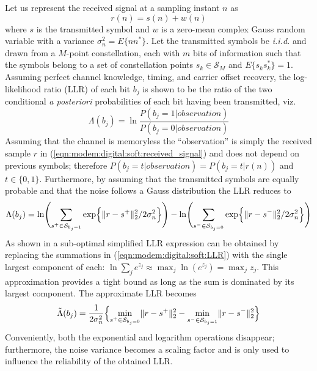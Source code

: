 %
Let us represent the received signal at a sampling instant $n$ as
%
\begin{equation}
\label{eqn:modem:digital:soft:received_signal}
    r(n) = s(n) + w(n)
\end{equation}
%
where $s$ is the transmitted symbol
and $w$ is a zero-mean complex Gauss random variable with
a variance $\sigma_n^2 = E\{n n^*\}$.
Let the transmitted symbols be {\em i.i.d.} and drawn from a $M$-point
constellation, each with $m$ bits of information
such that the symbols belong to a set of constellation points
$s_k \in \mathcal{S}_M$ and $E\{s_k s_k^*\}=1$.
%
Assuming perfect channel knowledge, timing, and carrier offset recovery,
the log-likelihood ratio (LLR) of each bit $b_j$ is shown to be
\cite[Eq.~(8)]{LeGoff:1994}
the ratio of the two conditional {\em a posteriori} probabilities of
each bit having been transmitted, viz.
%
\begin{equation}
\label{eqn:modem:digital:soft:LLR_true}
    \Lambda(b_j) =
        \ln \frac{
            P\left(b_j=1 | {observation} \right)
        }{
            P\left(b_j=0 | {observation} \right)
        }
\end{equation}
%
Assuming that the channel is memoryless the ``observation'' is simply
the received sample $r$ in
(\ref{eqn:modem:digital:soft:received_signal})
and does not depend on previous symbols; therefore
$P\left(b_j=t|{observation}\right) = P\left(b_j=t|r(n)\right)$
and $t \in \{0,1\}$.
Furthermore, by assuming that the transmitted symbols are equally
probable and that the noise follows a Gauss distribution
\cite{Qiang:2003}
the LLR reduces to
%
\begin{equation}
\label{eqn:modem:digital:soft:LLR}
    \Lambda(b_j) =
        \ln \Biggl(
            \sum_{s^+\in \mathcal{S}_{b_j=1}} { \exp\Bigl\{\|r-s^+\|_2^2 / 2 \sigma_n^2\Bigr\} }
        \Biggr)
       -\ln \Biggl(
            \sum_{s^-\in \mathcal{S}_{b_j=0}} { \exp\Bigl\{\|r-s^-\|_2^2 / 2 \sigma_n^2\Bigr\} }
        \Biggr)
\end{equation}
%
As shown in \cite{Qiang:2003} a sub-optimal simplified LLR expression
can be obtained by replacing the summations in
(\ref{eqn:modem:digital:soft:LLR}) with the single largest component of
each: $\ln \sum_j {e^{z_j}} \approx \max_j \ln (e^{z_j}) = \max_j z_j$.
This approximation provides a tight bound as long as the sum is
dominated by its largest component.
The approximate LLR becomes
%
\begin{equation}
\label{eqn:modem:digital:soft:LLR_approx}
    \tilde{\Lambda}(b_j) =
        \frac{1}{2\sigma_n^2}
        \Bigl\{
            \underset{s^+\in \mathcal{S}_{b_j=0}}{\min} \|r-s^+\|_2^2 -
            \underset{s^-\in \mathcal{S}_{b_j=1}}{\min} \|r-s^-\|_2^2
        \Bigr\}
\end{equation}
%
Conveniently, both the exponential and logarithm operations disappear;
furthermore, the noise variance becomes a scaling factor and is only
used to influence the reliability of the obtained LLR.

